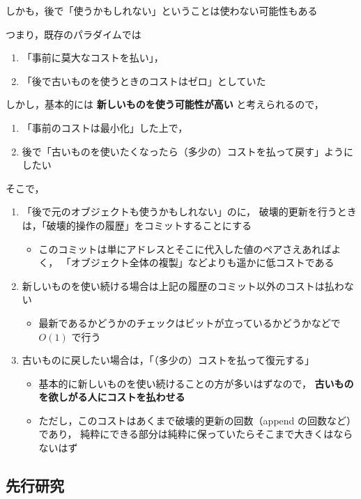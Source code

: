 \documentclass[10pt, a4j, twocolumn]{scrartcl}
\begin{document}
しかも，後で「使うかもしれない」ということは使わない可能性もある

つまり，既存のパラダイムでは
\begin{enumerate}
\item 「事前に莫大なコストを払い」，
\item 「後で古いものを使うときのコストはゼロ」としていた
\end{enumerate}

しかし，基本的には \textbf{\textbf{新しいものを使う可能性が高い}} と考えられるので，
\begin{enumerate}
\item 「事前のコストは最小化」した上で，
\item 後で「古いものを使いたくなったら（多少の）コストを払って戻す」ようにしたい
\end{enumerate}


そこで，
\begin{enumerate}
\item 「後で元のオブジェクトも使うかもしれない」のに，
破壊的更新を行うときは，「破壊的操作の履歴」をコミットすることにする
\begin{itemize}
\item このコミットは単にアドレスとそこに代入した値のペアさえあればよく，
「オブジェクト全体の複製」などよりも遥かに低コストである
\end{itemize}
\item 新しいものを使い続ける場合は上記の履歴のコミット以外のコストは払わない
\begin{itemize}
\item 最新であるかどうかのチェックはビットが立っているかどうかなどで \(O(1)\) で行う
\end{itemize}
\item 古いものに戻したい場合は，「（多少の）コストを払って復元する」
\begin{itemize}
\item 基本的に新しいものを使い続けることの方が多いはずなので，
\textbf{\textbf{古いものを欲しがる人にコストを払わせる}}
\item ただし，このコストはあくまで破壊的更新の回数（append の回数など）であり，
純粋にできる部分は純粋に保っていたらそこまで大きくはならないはず
\end{itemize}
\end{enumerate}


\subsection{先行研究}
\label{sec:org5fe22ee}
\end{document}
